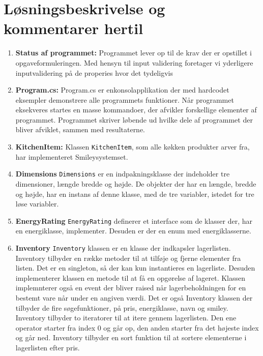 \documentclass[11pt]{article}
\newcommand{\mono}{\texttt}
\begin{document}
\section{Løsningsbeskrivelse og kommentarer hertil}
\begin{enumerate}
	\item[] \textbf{Status af programmet:}
	Programmet lever op til de krav der er opstillet i opgaveformuleringen. Med hensyn til input validering foretager vi yderligere inputvalidering på de properies hvor det tydeligvis 
	\item[] \textbf{Program.cs:}
	Program.cs er enkonsolapplikation der med hardcodet eksempler demonstrere alle programmets funktioner. Når programmet eksekveres startes en masse kommandoer, der afvikler forskellige elementer af programmet. Programmet skriver løbende ud hvilke dele af programmet der bliver afviklet, sammen med resultaterne. 
			
	\item[] \textbf{KitchenItem:} Klassen \mono{KitchenItem}, som alle køkken produkter arver fra, har implementeret Smileysystemset.
		
	\item[] \textbf{Dimensions} \mono{Dimensions} er en indpakningsklasse der indeholder tre dimensioner, længde bredde og højde. De objekter der har en længde, bredde og højde, har en instans af denne klasse, med de tre variabler, istedet for tre løse variabler.  
	
	\item[] \textbf{EnergyRating} \mono{EnergyRating} definerer et interface som de klasser der, har en energiklasse, implementer. Desuden er der en enum med energiklasserne. 	
	
	\item[] \textbf{Inventory} \mono{Inventory} klassen er en klasse der indkapsler lagerlisten. Inventory tilbyder en række metoder til at tilføje og fjerne elementer fra listen. Det er en singleton, så der kan kun instantieres en lagerliste. Desuden implementerer klassen en metode til at få en opgørelse af lageret. Klassen implemnterer også en event der bliver raised når lagerbeholdningen for en bestemt vare når under en angiven værdi. Det er også Inventory klassen der tilbyder de fire søgefunktioner, på pris, energiklasse, navn og smiley. Inventory tilbyder to iteratorer til at itere gennem lagerlisten. Den ene operator starter fra index 0 og går op, den anden starter fra det højeste index og går ned. Inventory tilbyder en sort funktion til at sortere elementerne i lagerlisten efter pris.
	

\end{enumerate}
\end{document}
